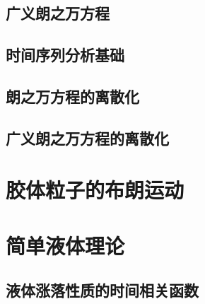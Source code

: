 \documentclass[zihao=-4,linespread=1.5,a4paper,heading=true,twoside]{ctexbook}
\theoremstyle{definition}
\theoremstyle{plain}
\begin{document}
\chapter{广义朗之万方程}

\chapter{时间序列分析基础}
\chapter{朗之万方程的离散化}
\chapter{广义朗之万方程的离散化}

\part{胶体粒子的布朗运动}

\part{简单液体理论}
\chapter{液体涨落性质的时间相关函数}
\end{document}
